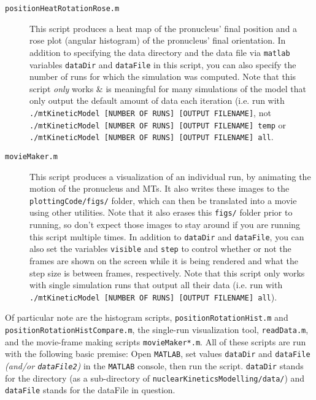 \documentclass{article}
\begin{document}
  \begin{description}
    \item[\texttt{positionHeatRotationRose.m}] This script produces a heat map
      of the pronucleus' final position and a rose plot (angular histogram) of
      the pronucleus' final orientation. In addition to specifying the data
      directory and the data file via \texttt{matlab} variables \texttt{dataDir}
      and \texttt{dataFile} in this script, you can also specify the number of
      runs for which the simulation was computed. Note that this script
      \emph{only} works & is meaningful for many simulations of the model that
      only output the default amount of data each iteration (i.e. run with
      \texttt{./mtKineticModel [NUMBER OF RUNS] [OUTPUT FILENAME]}, not 
      \texttt{./mtKineticModel [NUMBER OF RUNS] [OUTPUT FILENAME] temp} or 
      \texttt{./mtKineticModel [NUMBER OF RUNS] [OUTPUT FILENAME] all}.
    \item[\texttt{movieMaker.m}] This script produces a visualization of an
      individual run, by animating the motion of the pronucleus and MTs. It also
      writes these images to the \texttt{plottingCode/figs/} folder, which can
      then be translated into a movie using other utilities. Note that it also
      erases this \texttt{figs/} folder prior to running, so don't expect those
      images to stay around if you are running this script multiple times. In
      addition to \texttt{dataDir} and \texttt{dataFile}, you can also set the
      variables \texttt{visible} and \texttt{step} to control whether or not the
      frames are shown on the screen while it is being rendered and what the
      step size is between frames, respectively. Note that this script only
      works with single simulation runs that output all their data (i.e. run
      with \texttt{./mtKineticModel [NUMBER OF RUNS] [OUTPUT FILENAME] all}).
  \end{description}
  
  
  
  Of particular note are
  the histogram scripts, \texttt{positionRotationHist.m} and
  \texttt{positionRotationHistCompare.m}, the single-run visualization tool,
  \texttt{readData.m}, and the movie-frame making scripts
  \texttt{movieMaker*.m}. All of these scripts are run with the following basic
  premise: Open \texttt{MATLAB}, set values \texttt{dataDir} and
  \texttt{dataFile} \textit{(and/or \texttt{dataFile2})} in the \texttt{MATLAB}
  console, then run the script. \texttt{dataDir} stands for the directory (as a
  sub-directory of \texttt{nuclearKineticsModelling/data/}) and
  \texttt{dataFile} stands for the dataFile in question. 
\end{document}
